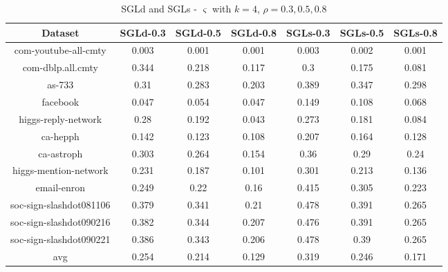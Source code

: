 \documentclass{sig-alternate-2013}
\begin{document}
\begin{table*}[!hpp]
\centering
\caption{SGLd and SGLs - $\varsigma$ with $k=4$, $\rho = 0.3, 0.5, 0.8$}
\begin{tabular}{ccccccc}
\hline
Dataset                     &SGLd-0.3       &SGLd-0.5       &SGLd-0.8       &SGLs-0.3       &SGLs-0.5       &SGLs-0.8\\
\hline
com-youtube-all-cmty	&0.003&0.001&0.001&0.003&0.002&0.001\\
com-dblp.all.cmty       &0.344&0.218&0.117&0.3&0.175&0.081\\
as-733                  &0.31&0.283&0.203&0.389&0.347&0.298\\
facebook                &0.047&0.054&0.047&0.149&0.108&0.068\\
higgs-reply-network     &0.28&0.192&0.043&0.273&0.181&0.084\\
ca-hepph                &0.142&0.123&0.108&0.207&0.164&0.128\\
ca-astroph              &0.303&0.264&0.154&0.36&0.29&0.24\\
higgs-mention-network   &0.231&0.187&0.101&0.301&0.213&0.136\\
email-enron             &0.249&0.22&0.16&0.415&0.305&0.223\\
soc-sign-slashdot081106 &0.379&0.341&0.21&0.478&0.391&0.265\\
soc-sign-slashdot090216 &0.382&0.344&0.207&0.476&0.391&0.265\\
soc-sign-slashdot090221 &0.386&0.343&0.206&0.478&0.39&0.265\\
\hline
avg                     &0.254&0.214&0.129&0.319&0.246&0.171\\
\hline
\end{tabular}
\end{table*}
\end{document}
